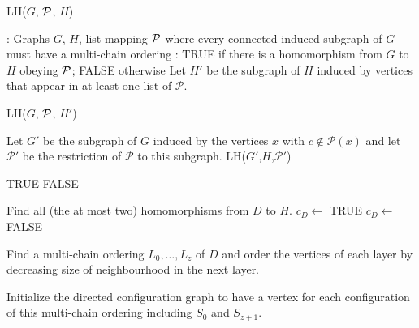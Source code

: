 \documentclass[12pt]{llncs}
\begin{document}
\begin{algorithm}
\caption{LH($G$, $\cal P$, $H$)}
\begin{algorithmic}

\smallskip

: Graphs $G$, $H$, list mapping $\cal P$ where every connected
induced subgraph of $G$ must have a multi-chain ordering
: TRUE if there is a homomorphism from $G$ to $H$ obeying
$\cal P$; FALSE otherwise
\smallskip
\State Let $H'$ be the subgraph of $H$ induced by vertices that appear in at
least one list of $\mathcal P$.

  \Return LH($G$, $\cal P$, $H'$)
\EndIf

  \State Let $G'$ be the subgraph of $G$ induced by the vertices $x$ with
  $c\notin\mathcal P(x)$
  \State \hspace{\algorithmicindent}  and let $\mathcal P'$ be the restriction of $\mathcal P$
  to this subgraph.
  \Return LH($G'$,$H$,$\mathcal P'$)
\EndIf

    \Return TRUE
  \Else
    \Return FALSE
  \EndIf
\EndIf


      \State Find all (the at most two) homomorphisms from $D$ to $H$.
            \State $c_D \leftarrow$ TRUE
        \Else
                 \State $c_D \leftarrow$ FALSE
        \EndIf

    \Else
        \State Find a multi-chain ordering $L_0,\ldots,L_z$ of $D$
        and order the vertices of 
        \State \hspace{\algorithmicindent} each layer by decreasing size of
        neighbourhood in the next layer.
        
        \State Initialize the directed configuration graph to have a vertex
        for each 
        \State \hspace{\algorithmicindent} configuration of this multi-chain ordering including $S_0$
        and $S_{z+1}$.


\end{algorithmic}
\end{algorithm}
\end{document}
